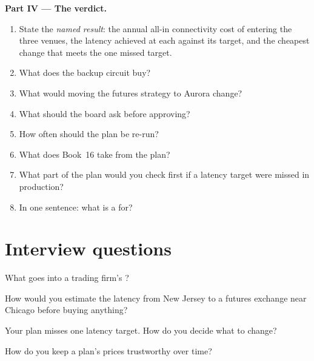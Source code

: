 \begin{problem}
\medskip\noindent\textbf{Part IV --- The verdict.}
\begin{enumerate}[resume]
\item State the \emph{named result}: the annual all-in connectivity cost of entering the three venues, the latency achieved at each
  against its target, and the cheapest change that meets the one missed target.
\item What does the backup circuit buy?
\item What would moving the futures strategy to Aurora change?
\item What should the board ask before approving?
\item How often should the plan be re-run?
\item What does Book~16 take from the plan?
\item What part of the plan would you check first if a latency target were missed in production?
\item In one sentence: what is a  for?
\end{enumerate}
\end{problem}

\section{Interview questions}

\begin{interviewq}\label{iq:nw:build-a-connectivity-plan:1}
What goes into a trading firm's ?
\end{interviewq}

\begin{interviewq}\label{iq:nw:build-a-connectivity-plan:2}
How would you estimate the latency from New Jersey to a futures exchange near Chicago before buying anything?
\end{interviewq}

\begin{interviewq}\label{iq:nw:build-a-connectivity-plan:3}
Your plan misses one latency target. How do you decide what to change?
\end{interviewq}

\begin{interviewq}\label{iq:nw:build-a-connectivity-plan:4}
How do you keep a plan's prices trustworthy over time?
\end{interviewq}

